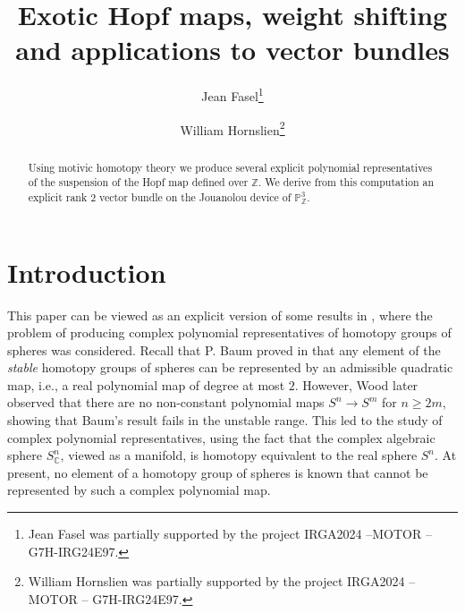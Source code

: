 \documentclass[11pt,leqno]{article}
\newcommand{\Z}{{\mathbb Z}}
\renewcommand{\1}{{\rm 1\hspace*{-0.4ex}%
\rule{0.1ex}{1.52ex}\hspace*{0.2ex}}}
\newcommand{\<}[1]{{\langle}#1 {\rangle}}
\theoremstyle{plain}
\theoremstyle{definition}
\theoremstyle{remark}
\numberwithin{equation}{section}
\begin{document}
\pagestyle{fancy}
\renewcommand{\sectionmark}[1]{\markright{\thesection\ #1}}
\fancyhead{}
\fancyhead[LO,R]{\bfseries\footnotesize\thepage}
\fancyhead[LE]{\bfseries\footnotesize\rightmark}
\fancyhead[RO]{\bfseries\footnotesize\rightmark}
\chead[]{}
\cfoot[]{}
\setlength{\headheight}{1cm}

\author{ Jean Fasel\thanks{Jean Fasel was partially supported by the project IRGA2024 –MOTOR – G7H-IRG24E97.}\and William Hornslien\thanks{William Hornslien was partially supported by the project IRGA2024 –MOTOR – G7H-IRG24E97.} }

\title{{\bf Exotic Hopf maps, weight shifting and applications to vector bundles}}
\date{}
\maketitle

\begin{abstract}
Using motivic homotopy theory we produce several explicit polynomial representatives of the suspension of the Hopf map defined over $\Z$. We derive from this computation an explicit rank $2$ vector bundle on the Jouanolou device of $\mathbb{P}^3_\Z$.
\end{abstract}

\begin{footnotesize}
\setcounter{tocdepth}{1}
\tableofcontents
\end{footnotesize}

\section{Introduction}


This paper can be viewed as an explicit version of some results in \cite{Asok20b}, where the problem of producing complex polynomial representatives of homotopy groups of spheres was considered. Recall that P. Baum proved in \cite{Baum67} that any element of the \emph{stable} homotopy groups of spheres can be represented by an admissible quadratic map, i.e., a real polynomial map of degree at most $2$. However, Wood later observed \cite{Wood68} that there are no non-constant polynomial maps $S^n\to S^m$ for $n\geq 2m$, showing that Baum's result fails in the unstable range. This led to the study of complex polynomial representatives, using the fact that the complex algebraic sphere $S_{\mathbb{C}}^n$, viewed as a manifold, is homotopy equivalent to the real sphere $S^n$. At present, no element of a homotopy group of spheres is known that cannot be represented by such a complex polynomial map.
\end{document}
